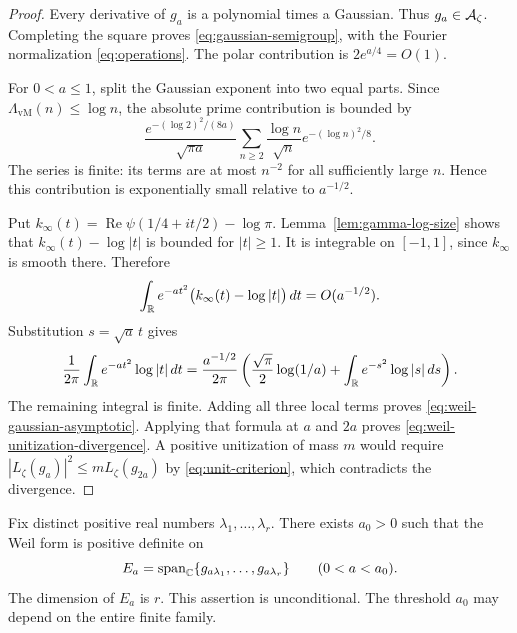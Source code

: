 \begin{proof}
Every derivative of $g_a$ is a polynomial times a Gaussian.
Thus $g_a\in\mathcal A_\zeta$.  Completing the square proves
\eqref{eq:gaussian-semigroup}, with the Fourier normalization
\eqref{eq:operations}.
The polar contribution is $2e^{a/4}=O(1)$.

For $0<a\leq1$, split the Gaussian exponent into two equal parts.
Since $\Lambda_{\mathrm{vM}}(n)\leq\log n$, the absolute prime contribution
is bounded by
\begin{equation}
 \frac{e^{-(\log2)^2/(8a)}}{\sqrt{\pi a}}
 \sum_{n\geq2}\frac{\log n}{\sqrt n}
                       e^{-(\log n)^2/8}.
 \label{eq:prime-gaussian-bound}
\end{equation}
The series is finite: its terms are at most $n^{-2}$ for all sufficiently
large $n$.  Hence this contribution is exponentially small relative to
$a^{-1/2}$.

Put $k_\infty(t)=\operatorname{Re}\psi(1/4+it/2)-\log\pi$.
Lemma~\ref{lem:gamma-log-size} shows that
$k_\infty(t)-\log|t|$ is bounded for $|t|\geq1$.
It is integrable on $[-1,1]$, since $k_\infty$ is smooth there.
Therefore
\[
 \int_{\mathbb R}e^{-at^2}\bigl(k_\infty(t)-\log|t|\bigr)\,dt
 =O(a^{-1/2}).
\]
Substitution $s=\sqrt a\,t$ gives
\[
 \frac1{2\pi}\int_{\mathbb R}e^{-at^2}\log|t|\,dt
 =\frac{a^{-1/2}}{2\pi}
 \left(\frac{\sqrt\pi}{2}\log(1/a)
          +\int_{\mathbb R}e^{-s^2}\log|s|\,ds\right).
\]
The remaining integral is finite.  Adding all three local terms proves
\eqref{eq:weil-gaussian-asymptotic}.
Applying that formula at $a$ and $2a$ proves
\eqref{eq:weil-unitization-divergence}.
A positive unitization of mass $m$ would require
$|L_\zeta(g_a)|^2\leq mL_\zeta(g_{2a})$ by
\eqref{eq:unit-criterion}, which contradicts the divergence.
\end{proof}

\begin{theorem}
\label{thm:gaussian-subspaces}
Fix distinct positive real numbers $\lambda_1,\ldots,\lambda_r$.
There exists $a_0>0$ such that the Weil form is positive definite on
\[
 E_a=\operatorname{span}_{\mathbb C}\{g_{a\lambda_1},\ldots,g_{a\lambda_r}\}
 \qquad(0<a<a_0).
\]
The dimension of $E_a$ is $r$.  This assertion is unconditional.
The threshold $a_0$ may depend on the entire finite family.
\end{theorem}

